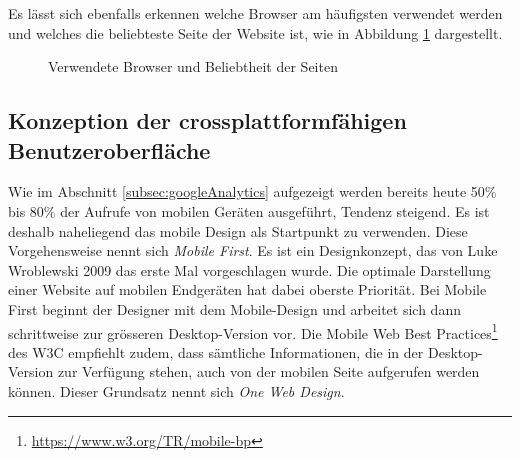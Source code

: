 Es lässt sich ebenfalls erkennen welche Browser am häufigsten verwendet werden und welches die beliebteste Seite der Website ist, wie in Abbildung \ref{img:google_browser} dargestellt.

\begin{figure}[h!]
	\centering
	\caption{Verwendete Browser und Beliebtheit der Seiten}
	\label{img:google_browser}
\end{figure}



\subsection{Konzeption der crossplattformfähigen Benutzeroberfläche}
Wie im Abschnitt \ref{subsec:googleAnalytics} aufgezeigt werden bereits heute 50\% bis 80\% der Aufrufe von mobilen Geräten ausgeführt, Tendenz steigend. Es ist deshalb naheliegend das mobile Design als Startpunkt zu verwenden. Diese Vorgehensweise nennt sich \textit{Mobile First}. Es ist ein Designkonzept, das von Luke Wroblewski 2009 das erste Mal vorgeschlagen wurde. Die optimale Darstellung einer Website auf mobilen Endgeräten hat dabei oberste Priorität. Bei Mobile First beginnt der Designer mit dem Mobile-Design und arbeitet sich dann schrittweise zur grösseren Desktop-Version vor. Die \flqq Mobile Web Best Practices\frqq \footnote{ \url{https://www.w3.org/TR/mobile-bp}} des W3C empfiehlt zudem, dass sämtliche Informationen, die in der Desktop-Version zur Verfügung stehen, auch von der mobilen Seite aufgerufen werden können. Dieser Grundsatz nennt sich \textit{One Web Design}.

